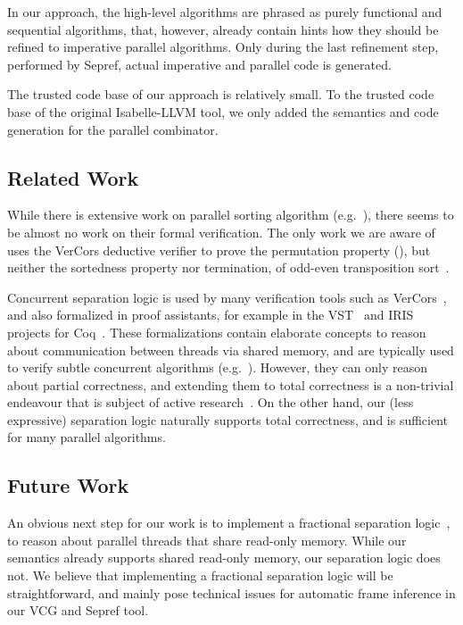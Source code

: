 \documentclass[runningheads]{llncs}
\begin{document}
    In our approach, the high-level algorithms are phrased as purely functional and sequential algorithms,
    that, however, already contain hints how they should be refined to imperative parallel algorithms.
    Only during the last refinement step, performed by Sepref, actual imperative and parallel code is generated.

    The trusted code base of our approach is relatively small.
    To the trusted code base of the original Isabelle-LLVM tool, we only added the semantics and code generation for the parallel combinator.

    \subsection{Related Work}
    While there is extensive work on parallel sorting algorithm (e.g.~\cite{CNLM08,AMI21}),
    there seems to be almost no work on their formal verification. The only work we are
    aware of~\cite{SaHu20} uses the VerCors deductive verifier to prove the permutation property (),
    but neither the sortedness property nor termination, of odd-even transposition sort~\cite{Ha72}.

    Concurrent separation logic is used by many verification tools such
    as VerCors~\cite{Vercors}, and also formalized in proof assistants, for example in the VST~\cite{VST}
    and IRIS~\cite{JKJA18} projects for Coq~\cite{BeCa10}. These formalizations contain elaborate concepts to
    reason about communication between threads via shared memory, and are typically used to
    verify subtle concurrent algorithms (e.g.~\cite{MeJo21}).
    However, they can only reason about partial correctness, and extending them to total correctness
    is a non-trivial endeavour that is subject of active research~\cite{SGGT21}.
    On the other hand, our (less expressive) separation logic naturally supports total correctness,
    and is sufficient for many parallel algorithms.



%


    \subsection{Future Work}
      An obvious next step for our work is to implement a fractional separation logic~\cite{BCOP05},
      to reason about parallel threads that share read-only memory. While our semantics
      already supports shared read-only memory, our separation logic does not.
      We believe that implementing a fractional separation logic will be straightforward,
      and mainly pose technical issues for automatic frame inference in our VCG and Sepref tool.
\end{document}
